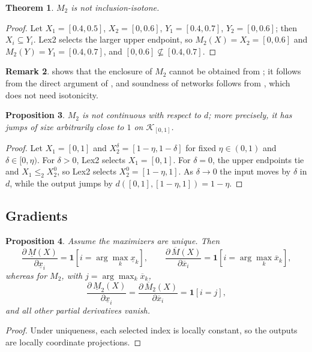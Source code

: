 \documentclass[preprint,12pt]{elsarticle}
\newtheorem{theorem}{Theorem}[section]
\newtheorem{proposition}[theorem]{Proposition}
\theoremstyle{definition}
\newtheorem{remark}[theorem]{Remark}
\newcommand{\K}{\mathcal{K}}
\newcommand{\lo}[1]{\underline{#1}}
\newcommand{\up}[1]{\overline{#1}}
\begin{document}
\begin{theorem}\label{thm:not-isotone}
$M_2$ is not inclusion-isotone.
\end{theorem}

\begin{proof}
Let $X_1=[0.4,0.5]$, $X_2=[0,0.6]$, $Y_1=[0.4,0.7]$, $Y_2=[0,0.6]$; then $X_i\subseteq Y_i$. Lex2 selects the larger upper endpoint, so $M_2(X)=X_2=[0,0.6]$ and $M_2(Y)=Y_1=[0.4,0.7]$, and $[0,0.6]\not\subseteq[0.4,0.7]$.
\end{proof}

\begin{remark}
 shows that the enclosure of $M_2$ cannot be obtained from ; it follows from the direct argument of , and soundness of networks follows from , which does not need isotonicity.
\end{remark}

\begin{proposition}\label{prop:discont}
$M_2$ is not continuous with respect to $d$; more precisely, it has jumps of size arbitrarily close to $1$ on $\K_{[0,1]}$.
\end{proposition}

\begin{proof}
Let $X_1=[0,1]$ and $X_2^\delta=[1-\eta,1-\delta]$ for fixed $\eta\in(0,1)$ and $\delta\in[0,\eta)$. For $\delta>0$, Lex2 selects $X_1=[0,1]$. For $\delta=0$, the upper endpoints tie and $X_1\le_2X_2^0$, so Lex2 selects $X_2^0=[1-\eta,1]$. As $\delta\to0$ the input moves by $\delta$ in $d$, while the output jumps by $d([0,1],[1-\eta,1])=1-\eta$.
\end{proof}

\subsection{Gradients}

\begin{proposition}\label{prop:grad}
Assume the maximizers are unique. Then
\[
\frac{\partial\,\lo M(X)}{\partial\lo x_i}=\mathbf 1[i=\arg\max_k\lo x_k],\qquad
\frac{\partial\,\up M(X)}{\partial\up x_i}=\mathbf 1[i=\arg\max_k\up x_k],
\]
whereas for $M_2$, with $j=\arg\max_k\up x_k$,
\[
\frac{\partial\,\lo M_2(X)}{\partial\lo x_i}=\frac{\partial\,\up M_2(X)}{\partial\up x_i}=\mathbf 1[i=j],
\]
and all other partial derivatives vanish.
\end{proposition}

\begin{proof}
Under uniqueness, each selected index is locally constant, so the outputs are locally coordinate projections.
\end{proof}
\end{document}
